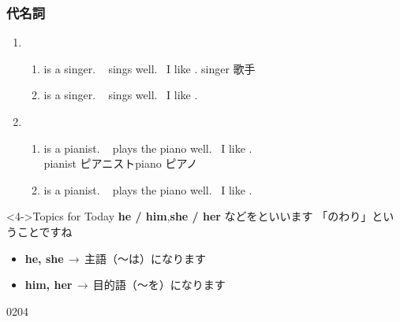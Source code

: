 \documentclass[aspectratio=169,xcolor={dvipsnames,table}]{beamer}
\begin{document}
\begin{frame}[plain]\frametitle{代名詞}
\begin{enumerate}
 \item \begin{enumerate}
	\item<1->  is a singer.\,\,\,\,\, sings well.\,\,\,\,\,I like .%
\hfill{\scriptsize singer  歌手}
	\item<2->  is a singer.\,\,\,\,\, sings well.\,\,\,\,\,I like .
       \end{enumerate}
 \item \begin{enumerate}
	\item<1->  is a pianist.\,\,\,\,\, plays the piano well.\,\,\,\,\,I like .\\%
\hfill{\scriptsize pianist  ピアニスト\hspace{1\zw}piano  ピアノ}
	\item<3->  is a pianist.\,\,\,\,\, plays the piano well.\,\,\,\,\,I like . 
       \end{enumerate}
\end{enumerate}

\vfill

\begin{block}<4->{Topics for Today}
\textbf{he / him},\hspace{8pt}\textbf{she / her} などをといいます%
\hfill{}{\scriptsize 「のわり」ということですね}
\begin{itemize}[circle]
 \item<5-> \textbf{he, she}\,$\longrightarrow$\,主語（～は）になります\hfill{}\hspace{80pt}\mbox{}
 \item<6-> \textbf{him, her}\,$\longrightarrow$\,目的語（～を）になります\hfill{}\hspace{80pt}\mbox{}
\end{itemize}
     \end{block}

\hfill{\tiny 0204}\,{\scriptsize {}}
\end{frame}
\end{document}
